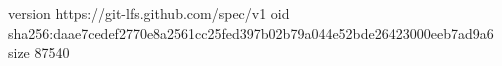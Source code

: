 version https://git-lfs.github.com/spec/v1
oid sha256:daae7cedef2770e8a2561cc25fed397b02b79a044e52bde26423000eeb7ad9a6
size 87540
